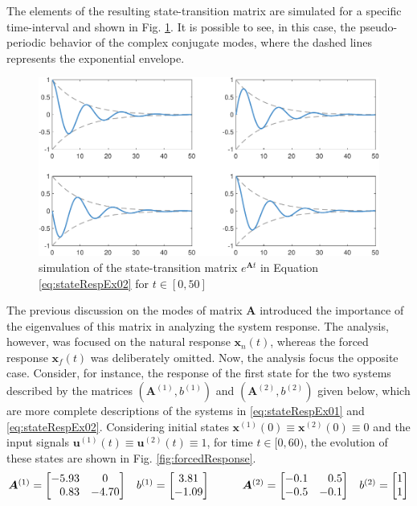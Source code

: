 \documentclass[a4paper,11pt]{book}
\numberwithin{figure}{chapter}
\numberwithin{equation}{chapter}
\numberwithin{table}{chapter}
\theoremstyle{definition}
\begin{document}
The elements of the resulting state-transition matrix are simulated for a specific time-interval and shown in Fig. \ref{fig:stateTrans02}. It is possible to see, in this case, the pseudo-periodic behavior of the complex conjugate modes, where the dashed lines represents the exponential envelope. 

\begin{figure}[ht]
	\centering
	\includegraphics[width=\textwidth]{chapter2/stateTrans02}
	\caption{simulation of the state-transition matrix $e^{\bm{A} t}$ in Equation \eqref{eq:stateRespEx02} for $t \in [0,50]$}
	\label{fig:stateTrans02}
\end{figure}

The previous discussion on the modes of matrix $\bm{A}$ introduced the importance of the eigenvalues of this matrix in analyzing the system response. The analysis, however, was focused on the natural response $\bm{x}_n(t)$, whereas the forced response $\bm{x}_f(t)$ was deliberately omitted. Now, the analysis focus the opposite case. Consider, for instance, the response of the first state for the two systems described by the matrices $(\bm{A}^{(1)}, b^{(1)})$ and $(\bm{A}^{(2)}, b^{(2)})$ given below, which are more complete descriptions of the systems in \eqref{eq:stateRespEx01} and \eqref{eq:stateRespEx02}. Considering initial states $\bm{x}^{(1)}(0) \equiv \bm{x}^{(2)}(0) \equiv 0$ and the input signals $\bm{u}^{(1)}(t) \equiv \bm{u}^{(2)}(t) \equiv 1$, for time $t \in [0, 60)$, the evolution of these states are shown in Fig. \ref{fig:forcedResponse}.
\begin{equation} \label{eq:isoSys02}
\begin{matrix}
    \bm{A}^{(1)} = \begin{bmatrix} 
    	-5.93  &      0 \\
	    \hfill 0.83   &  -4.70 
    \end{bmatrix} & b^{(1)} = \begin{bmatrix} 3.81 \\ -1.09 \end{bmatrix} & & & \bm{A}^{(2)} = \begin{bmatrix} 
    	 -0.1  &  \hfill 0.5 \\
	    -0.5   &  -0.1 
    \end{bmatrix} & b^{(2)} = \begin{bmatrix} 1 \\ 1 \end{bmatrix}
\end{matrix}
\end{equation}
\end{document}
